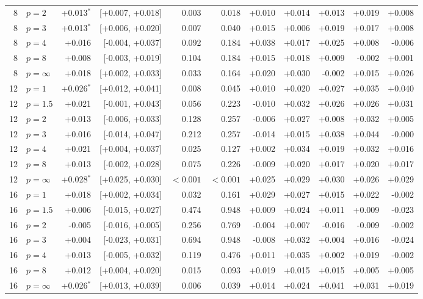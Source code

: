 \begin{longtable}{rlrrrrrrrrr}
8 & $p=2$ & +0.013$^{*}$ & [+0.007, +0.018] & 0.003 & 0.018 & +0.010 & +0.014 & +0.013 & +0.019 & +0.008 \\
8 & $p=3$ & +0.013$^{*}$ & [+0.006, +0.020] & 0.007 & 0.040 & +0.015 & +0.006 & +0.019 & +0.017 & +0.008 \\
8 & $p=4$ & +0.016 & [-0.004, +0.037] & 0.092 & 0.184 & +0.038 & +0.017 & +0.025 & +0.008 & -0.006 \\
8 & $p=8$ & +0.008 & [-0.003, +0.019] & 0.104 & 0.184 & +0.015 & +0.018 & +0.009 & -0.002 & +0.001 \\
8 & $p=\infty$ & +0.018 & [+0.002, +0.033] & 0.033 & 0.164 & +0.020 & +0.030 & -0.002 & +0.015 & +0.026 \\
\midrule
12 & $p=1$ & +0.026$^{*}$ & [+0.012, +0.041] & 0.008 & 0.045 & +0.010 & +0.020 & +0.027 & +0.035 & +0.040 \\
12 & $p=1.5$ & +0.021 & [-0.001, +0.043] & 0.056 & 0.223 & -0.010 & +0.032 & +0.026 & +0.026 & +0.031 \\
12 & $p=2$ & +0.013 & [-0.006, +0.033] & 0.128 & 0.257 & -0.006 & +0.027 & +0.008 & +0.032 & +0.005 \\
12 & $p=3$ & +0.016 & [-0.014, +0.047] & 0.212 & 0.257 & -0.014 & +0.015 & +0.038 & +0.044 & -0.000 \\
12 & $p=4$ & +0.021 & [+0.004, +0.037] & 0.025 & 0.127 & +0.002 & +0.034 & +0.019 & +0.032 & +0.016 \\
12 & $p=8$ & +0.013 & [-0.002, +0.028] & 0.075 & 0.226 & -0.009 & +0.020 & +0.017 & +0.020 & +0.017 \\
12 & $p=\infty$ & +0.028$^{*}$ & [+0.025, +0.030] & $<0.001$ & $<0.001$ & +0.025 & +0.029 & +0.030 & +0.026 & +0.029 \\
\midrule
16 & $p=1$ & +0.018 & [+0.002, +0.034] & 0.032 & 0.161 & +0.029 & +0.027 & +0.015 & +0.022 & -0.002 \\
16 & $p=1.5$ & +0.006 & [-0.015, +0.027] & 0.474 & 0.948 & +0.009 & +0.024 & +0.011 & +0.009 & -0.023 \\
16 & $p=2$ & -0.005 & [-0.016, +0.005] & 0.256 & 0.769 & -0.004 & +0.007 & -0.016 & -0.009 & -0.002 \\
16 & $p=3$ & +0.004 & [-0.023, +0.031] & 0.694 & 0.948 & -0.008 & +0.032 & +0.004 & +0.016 & -0.024 \\
16 & $p=4$ & +0.013 & [-0.005, +0.032] & 0.119 & 0.476 & +0.011 & +0.035 & +0.002 & +0.019 & -0.002 \\
16 & $p=8$ & +0.012 & [+0.004, +0.020] & 0.015 & 0.093 & +0.019 & +0.015 & +0.015 & +0.005 & +0.005 \\
16 & $p=\infty$ & +0.026$^{*}$ & [+0.013, +0.039] & 0.006 & 0.039 & +0.014 & +0.024 & +0.041 & +0.031 & +0.019 \\
\bottomrule
\end{longtable}
